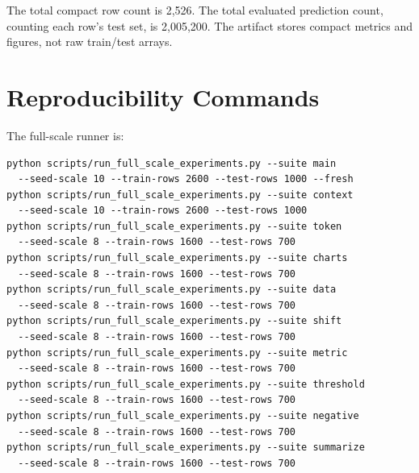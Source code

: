 \documentclass{article}
\begin{document}
\begin{table}[h]
\centering
\caption{Full-scale artifact inventory.}
\label{tab:inventory}
\end{table}

The total compact row count is 2,526. The total evaluated prediction count,
counting each row's test set, is 2,005,200. The artifact stores compact metrics
and figures, not raw train/test arrays.

\section{Reproducibility Commands}

The full-scale runner is:

\begin{verbatim}
python scripts/run_full_scale_experiments.py --suite main
  --seed-scale 10 --train-rows 2600 --test-rows 1000 --fresh
python scripts/run_full_scale_experiments.py --suite context
  --seed-scale 10 --train-rows 2600 --test-rows 1000
python scripts/run_full_scale_experiments.py --suite token
  --seed-scale 8 --train-rows 1600 --test-rows 700
python scripts/run_full_scale_experiments.py --suite charts
  --seed-scale 8 --train-rows 1600 --test-rows 700
python scripts/run_full_scale_experiments.py --suite data
  --seed-scale 8 --train-rows 1600 --test-rows 700
python scripts/run_full_scale_experiments.py --suite shift
  --seed-scale 8 --train-rows 1600 --test-rows 700
python scripts/run_full_scale_experiments.py --suite metric
  --seed-scale 8 --train-rows 1600 --test-rows 700
python scripts/run_full_scale_experiments.py --suite threshold
  --seed-scale 8 --train-rows 1600 --test-rows 700
python scripts/run_full_scale_experiments.py --suite negative
  --seed-scale 8 --train-rows 1600 --test-rows 700
python scripts/run_full_scale_experiments.py --suite summarize
  --seed-scale 8 --train-rows 1600 --test-rows 700
\end{verbatim}
\end{document}
